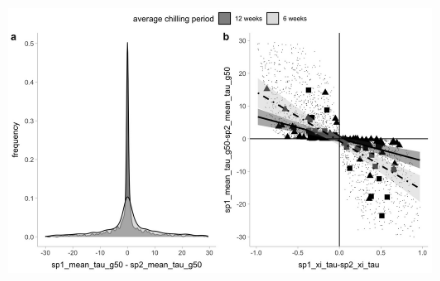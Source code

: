 \documentclass{article}[12pt]
\begin{document}
\begin{figure}[h!]
  \centering
 \includegraphics[width=\textwidth]{..//plots/coexistance_explainer.jpeg}
    \caption{}
    \label{Fig:differences}
\end{figure}
\end{document}
